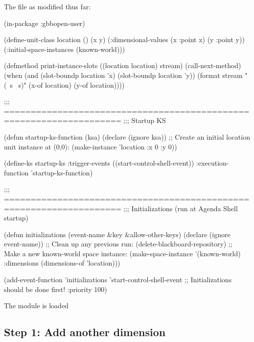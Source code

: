 \documentclass[10pt,twoside,english,pdftex]{article}
\begin{document}
\begin{tightitemize}
\item The  file as modified thus far:
\end{tightitemize}
%
\W\supp
\begin{example}
  (in-package :gbbopen-user)

  (define-unit-class location ()
    (x y)
    (:dimensional-values
      (x :point x)
      (y :point y))
    (:initial-space-instances (known-world)))

  (defmethod print-instance-slots ((location location) stream)
    (call-next-method)
    (when (and (slot-boundp location 'x)
               (slot-boundp location 'y))
      (format stream " (~s ~s)"
              (x-of location)
              (y-of location))))

  ;;; ====================================================================
  ;;;   Startup KS

  (defun startup-ks-function (ksa)
    (declare (ignore ksa))
    ;; Create an initial location unit instance at (0,0):
    (make-instance 'location :x 0 :y 0))

  (define-ks startup-ks
      :trigger-events ((start-control-shell-event))
      :execution-function 'startup-ks-function)

  ;;; ====================================================================
  ;;;   Initializations (run at Agenda Shell startup)

  (defun initializations (event-name &key &allow-other-keys)
    (declare (ignore event-name))
    ;; Clean up any previous run:
    (delete-blackboard-repository)
    ;; Make a new known-world space instance:
    (make-space-instance 
     '(known-world)
     :dimensions (dimensions-of 'location)))

  (add-event-function 'initializations 'start-control-shell-event
                      ;; Initializations should be done first!
                      :priority 100)
\end{example}

\begin{tightitemize}
\item The  module is loaded
\end{tightitemize}

\subsection*{Step 1: Add  another dimension}
\end{document}
